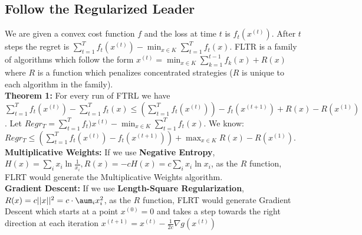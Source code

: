 \documentclass{article}
\begin{document}
\begin{multicols}{2}
\section*{Follow the Regularized Leader}
We are given a convex cost function $f$ and the loss at time $t$ is $f_t(x^(t))$. After $t$ steps the regret is $\sum_{t=1}^T f_t(x^{(t)}) - \min_{x \in K} \sum_{t=1}^{T} f_t(x)$. FLTR is a family of algorithms which follow the form $x^{(t)} = \min_{x\in K} \sum_{k=1}^{t-1} f_k(x) + R(x)$ where $R$ is a function which penalizes concentrated strategies ($R$ is unique to each algorithm in the family). \\
\textbf{Theorem 1: }For every run of FTRL we have $\sum_{t=1}^{T} f_t(x^{(t)}) - \sum_{t=1}^T f_t(x) \leq (\sum_{t=1}^{T} f_t (x^{(t)})) - f_t(x^{(t+1)}) + R(x) - R(x^{(1)})$. Let $Regr_T = \sum_{t=1}^T f_t)x^{(t)} - \min_{x \in K} \sum_{t=1}^{T} f_t(x)$. We know: $Regr_T \leq (\sum_{t=1}^{T} f_t(x^{(t)}) - f_t(x^{(t+1)})) + \max_{x \in K} R(x) - R(x^{(1)})$. \\
\textbf{Multiplicative Weights:} If we use \textbf{Negative Entropy}, $H(x) = \sum_i x_i \ln \frac{1}{x_i}, R(x) = -cH(x) = c \sum_i x_i \ln x_i$, as the $R$ function, FLRT would generate the Multiplicative Weights algorithm. \\
\textbf{Gradient Descent:} If we use \textbf{Length-Square Regularization}, $R(x) = c||x||^2 = c \cdot \aum_i x_i^2$, as the $R$ function, FLRT would generate Gradient Descent which starts at a point $x^{(0)} = 0$ and takes a step towards the right direction at each iteration $x^{(t+1)} = x^{(t)} - \frac{1}{2c} \nabla g(x^{(t)})$

\end{multicols}
\end{document}
